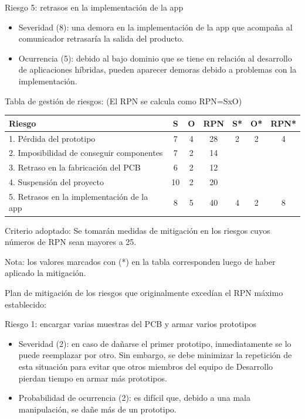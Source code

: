 \documentclass[
11pt, %
codirector, %
]{charter}
\begin{document}
Riesgo 5: retrasos en la implementación de la app
\begin{itemize}
	\item Severidad (8): una demora en la implementación de la app que acompaña al comunicador retrasaría la salida del producto.
	\item Ocurrencia (5): debido al bajo dominio que se tiene en relación al desarrollo de aplicaciones híbridas, pueden aparecer demoras debido a problemas con la implementación.
\end{itemize}


Tabla de gestión de riesgos:      (El RPN se calcula como RPN=SxO)

\begin{table}[htpb]
\centering
\begin{tabularx}{\linewidth}{@{}|X|c|c|c|c|c|c|@{}}
\hline
\rowcolor[HTML]{C0C0C0} 
Riesgo & S & O & RPN & S* & O* & RPN* \\ \hline
   1. Pérdida del prototipo    & 7  & 4  &  28   &  2  &  2  &   4   \\ \hline
   2. Imposibilidad de conseguir componentes   & 7  & 2  &  14   &    &    &      \\ \hline
   3. Retraso en la fabricación del PCB   & 6  & 2  &  12   &    &    &      \\ \hline
   4. Suspensión del proyecto   & 10  & 2  & 20   &    &    &      \\ \hline
   5. Retrasos en la implementación de la app   & 8  & 5  &  40   & 4   & 2   &  8    \\ \hline
\end{tabularx}%
\end{table}

Criterio adoptado: 
Se tomarán medidas de mitigación en los riesgos cuyos números de RPN sean mayores a 25.

Nota: los valores marcados con (*) en la tabla corresponden luego de haber aplicado la mitigación.

Plan de mitigación de los riesgos que originalmente excedían el RPN máximo establecido:
 
Riesgo 1: encargar varias muestras del PCB y armar varios prototipos
\begin{itemize}
  \item Severidad (2): en caso de dañarse el primer prototipo, inmediatamente se lo puede reemplazar por otro. Sin embargo, se debe minimizar la repetición de esta situación para evitar que otros miembros del equipo de Desarrollo pierdan tiempo en armar más prototipos.
  \item Probabilidad de ocurrencia (2): es difícil que, debido a una mala manipulación, se dañe más de un prototipo.
\end{itemize}
\end{document}
